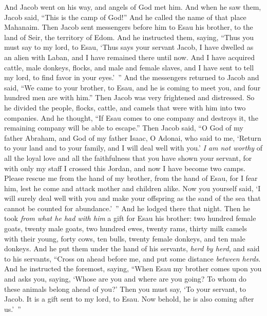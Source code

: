 \begin{biblechapter} %
 And Jacob went on his way, and angels of God met him.
\verse And when he saw them, Jacob said, “This is the camp of God!” And he called the name of that place Mahanaim.
\verse Then Jacob sent messengers before him to Esau his brother, to the land of Seir, the territory of Edom.
\verse And he instructed them, saying, “Thus you must say to my lord, to Esau, ‘Thus says your servant Jacob, I have dwelled as an alien with Laban, and I have remained there until now.
\verse And I have acquired cattle, male donkeys, flocks, and male and female slaves, and I have sent to tell my lord, to find favor in your eyes.’ ”
\verse And the messengers returned to Jacob and said, “We came to your brother, to Esau, and he is coming to meet you, and four hundred men are with him.”
\verse Then Jacob was very frightened and distressed. So he divided the people, flocks, cattle, and camels that were with him into two companies.
\verse And he thought, “If Esau comes to one company and destroys it, the remaining company will be able to escape.”
\verse Then Jacob said, “O God of my father Abraham, and God of my father Isaac, O Adonai, who said to me, ‘Return to your land and to your family, and I will deal well with you.’
\verse \textit{I am not worthy} of all the loyal love and all the faithfulness that you have shown your servant, for with only my staff I crossed this Jordan, and now I have become two camps.
\verse Please rescue me from the hand of my brother, from the hand of Esau, for I fear him, lest he come and attack mother and children alike.
\verse Now you yourself said, ‘I will surely deal well with you and make your offspring as the sand of the sea that cannot be counted for abundance.’ ”
\verse And he lodged there that night. Then he took \textit{from what he had with him} a gift for Esau his brother:
\verse two hundred female goats, twenty male goats, two hundred ewes, twenty rams,
\verse thirty milk camels with their young, forty cows, ten bulls, twenty female donkeys, and ten male donkeys.
\verse And he put them under the hand of his servants, \textit{herd by herd}, and said to his servants, “Cross on ahead before me, and put some distance \textit{between herds}.
\verse And he instructed the foremost, saying, “When Esau my brother comes upon you and asks you, saying, ‘Whose are you and where are you going? To whom do these animals belong ahead of you?’
\verse Then you must say, ‘To your servant, to Jacob. It is a gift sent to my lord, to Esau. Now behold, he is also coming after us.’ ”

\end{biblechapter}
